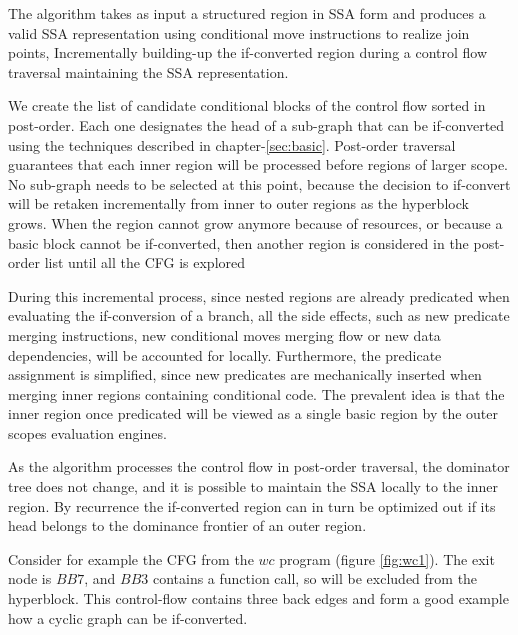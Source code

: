 The algorithm takes as input a structured region in SSA form and produces a valid SSA representation using conditional move instructions to realize join points, Incrementally building-up the if-converted region during a control flow traversal maintaining the SSA representation.

We create the list of candidate conditional blocks of the control flow sorted in post-order. Each one designates the head of a sub-graph that can be if-converted using the techniques described in chapter-\ref{sec:basic}. Post-order traversal guarantees that each inner region will be processed before regions of larger scope. No sub-graph needs to be selected at this point, because the decision to if-convert will be retaken incrementally from inner to outer regions as the hyperblock grows. When the region cannot grow anymore because of resources, or because a basic block cannot be if-converted, then another region is considered in the post-order list until all the CFG is explored

During this incremental process, since nested regions are already predicated when evaluating the if-conversion of a branch, all the side effects, such as new predicate merging instructions, new conditional moves merging flow or new data dependencies, will be accounted for locally. Furthermore, the predicate assignment is simplified, since new predicates are mechanically inserted when merging inner regions containing conditional code. The prevalent idea is that the inner region once predicated will be viewed as a single basic region by the outer scopes evaluation engines.

As the algorithm processes the control flow in post-order traversal, the dominator tree does not change, and it is possible to maintain the SSA locally to the inner region. By recurrence the if-converted region can in turn be optimized out if its head belongs to the dominance frontier of an outer region.

Consider for example the CFG from the $wc$ program (figure \ref{fig:wc1}). The exit node is $BB7$, and $BB3$ contains a function call, so will be excluded from the hyperblock. This control-flow contains three back edges and form a good example how a cyclic graph can be if-converted.


